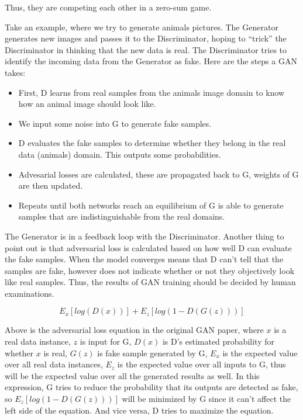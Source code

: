 \documentclass[12pt]{report}
\begin{document}

Thus, they are competing each other in a zero-sum game.

Take an example, where we try to generate animals pictures. The Generator generates new images and passes it to the Discriminator, hoping to “trick” the Discriminator in thinking that the new data is real. The Discriminator tries to identify the incoming data from the Generator as fake.
Here are the steps a GAN takes:
\begin{itemize}
	\item First, D learns from real samples from the animals image domain to know how an animal image should look like.
	\item We input some noise into G to generate fake samples.
	\item D evaluates the fake samples to determine whether they belong in the real data (animals) domain. This outputs some probabilities. 
	\item Advesarial losses are calculated, these are propagated back to G, weights of G are then updated.
	\item Repeats until both networks reach an equilibrium of G is able to generate samples that are indistinguishable from the real domains.
\end{itemize}

The Generator is in a feedback loop with the Discriminator. Another thing to point out is that adversarial loss is calculated based on how well D can evaluate the fake samples. When the model converges means that D can't tell that the samples are fake, however does not indicate whether or not they objectively look like real samples. Thus, the results of GAN training should be decided by human examinations.

\[E_x[log(D(x))] + E_z[log(1 - D(G(z)))]\]

Above is the adversarial loss equation in the original GAN paper, where $x$ is a real data instance, $z$ is input for G, $D(x)$ is D's estimated probability for whether $x$ is real, $G(z)$ is fake sample generated by G, $E_x$ is the expected value over all real data instances, $E_z$ is the expected value over all inputs to G, thus will be the expected value over all the generated results as well. In this expression, G tries to reduce the probability that its outputs are detected as fake, so $E_z[log(1-D(G(z)))]$ will be minimized by G since it can't affect the left side of the equation. And vice versa, D tries to maximize the equation.
\end{document}

